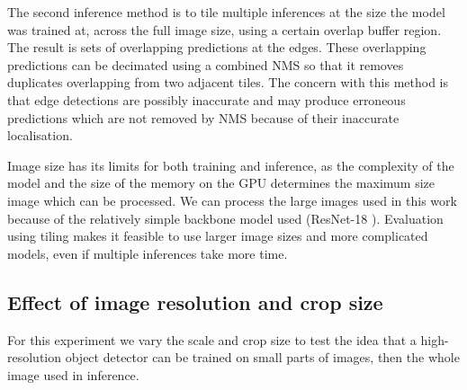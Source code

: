 \documentclass[conference]{IEEEtran}
\begin{document}
The second inference method is to tile multiple inferences at the size the model was trained at, across the full image size, using a certain overlap buffer region. The result is sets of overlapping predictions at the edges. These overlapping predictions can be decimated using a combined \gls{NMS} so that it removes duplicates overlapping from two adjacent tiles. The concern with this method is that edge detections are possibly inaccurate and may produce erroneous predictions which are not removed by \gls{NMS} because of their inaccurate localisation. 

Image size has its limits for both training and inference, as the complexity of the model and the size of the memory on the \gls{GPU} determines the maximum size image which can be processed. We can process the large images used in this work because of the relatively simple backbone model used (ResNet-18 \cite{He}). Evaluation using tiling makes it feasible to use larger image sizes and more complicated models, even if multiple inferences take more time.


\subsection {Effect of image resolution and crop size}
\label{sec:scale_crop}

For this experiment we vary the scale and crop size to test the idea that a high-resolution object detector can be trained on small parts of images, then the whole image used in inference.
\end{document}
